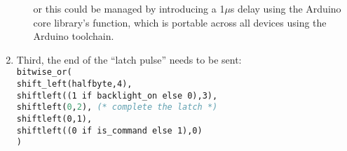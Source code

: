 \begin{enumerate}
\begin{itemize}
            or this could be managed by introducing a 1$\mu$s delay using the Arduino core library's  function,\cite{arduinoDelay} which is portable across all devices using the Arduino toolchain.
    \end{itemize}
    \item Third, the end of the ``latch pulse'' needs to be sent: \\
        \phantom{XX}\lstinline{bitwise_or(} \\
        \phantom{XXXX}\lstinline{shift_left(halfbyte,4),} \\
        \phantom{XXXX}\lstinline{shiftleft((1 if backlight_on else 0),3),} \\
        \phantom{XXXX}\lstinline[language=pascal]{shiftleft(0,2), (* complete the latch *)} \\
        \phantom{XXXX}\lstinline{shiftleft(0,1),} \\
        \phantom{XXXX}\lstinline{shiftleft((0 if is_command else 1),0)} \\
        \phantom{XX}\lstinline{)}


\end{enumerate}
